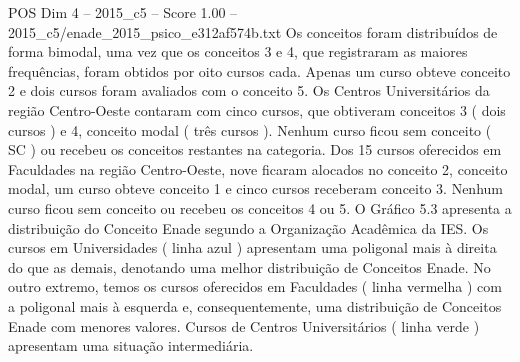 \begin{textsample}{POS Dim 4 – 2015\_c5 – Score 1.00 – 2015\_c5/enade\_2015\_psico\_e312af574b.txt}
Os conceitos foram distribuídos de forma bimodal, uma vez que os conceitos 3 e 4, que registraram as maiores frequências, foram obtidos por oito cursos cada.
Apenas um curso obteve conceito 2 e dois cursos foram avaliados com o conceito 5.
Os Centros Universitários da região Centro-Oeste contaram com cinco cursos, que obtiveram conceitos 3 ( dois cursos ) e 4, conceito modal ( três cursos ).
Nenhum curso ficou sem conceito ( SC ) ou recebeu os conceitos restantes na categoria.
Dos 15 cursos oferecidos em Faculdades na região Centro-Oeste, nove ficaram alocados no conceito 2, conceito modal, um curso obteve conceito 1 e cinco cursos receberam conceito 3.
Nenhum curso ficou sem conceito ou recebeu os conceitos 4 ou 5.
O Gráfico 5.3 apresenta a distribuição do Conceito Enade segundo a Organização Acadêmica da IES.
Os cursos em Universidades ( linha azul ) apresentam uma poligonal mais à direita do que as demais, denotando uma melhor distribuição de Conceitos Enade.
No outro extremo, temos os cursos oferecidos em Faculdades ( linha vermelha ) com a poligonal mais à esquerda e, consequentemente, uma distribuição de Conceitos Enade com menores valores.
Cursos de Centros Universitários ( linha verde ) apresentam uma situação intermediária.

\end{textsample}
